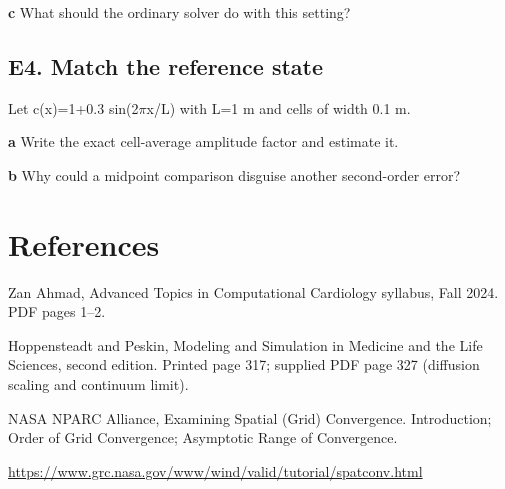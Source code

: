 \documentclass[11pt,letterpaper]{article}
\theoremstyle{definition}\newtheorem{definition}{Definition}\newtheorem{example}{Example}
\numberwithin{equation}{section}
\begin{document}
\textbf{c} What should the ordinary solver do with this setting?

\par\noindent\begin{minipage}{\linewidth}
\subsection*{E4. Match the reference state}
Let c(x)=\allowbreak{}1+\allowbreak{}0.3 sin(2$\pi$x/L) with L=\allowbreak{}1 m and cells of width 0.1 m.

\textbf{a} Write the exact cell-average amplitude factor and estimate it.

\end{minipage}\par\medskip
\textbf{b} Why could a midpoint comparison disguise another second-order error?

\section*{References}
\noindent\begin{minipage}{\linewidth}
Zan Ahmad, Advanced Topics in Computational Cardiology syllabus, Fall 2024. PDF pages 1--2.

\end{minipage}\par\medskip
\noindent\begin{minipage}{\linewidth}
Hoppensteadt and Peskin, Modeling and Simulation in Medicine and the Life Sciences, second edition. Printed page 317; supplied PDF page 327 (diffusion scaling and continuum limit).

\end{minipage}\par\medskip
\noindent\begin{minipage}{\linewidth}
NASA NPARC Alliance, Examining Spatial (Grid) Convergence. Introduction; Order of Grid Convergence; Asymptotic Range of Convergence.

\url{https://www.grc.nasa.gov/www/wind/valid/tutorial/spatconv.html}
\end{minipage}\par\medskip
\end{document}
